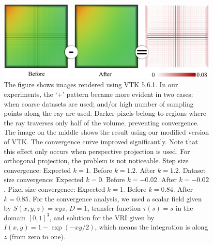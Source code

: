 \begin{figure}[b]
\centering
\includegraphics[width=0.98\linewidth]{chapter5/figures/fp-fcm-before-after.png}
\caption{\label{fig:fp-rcm-example} The figure shows images rendered
  using VTK 5.6.1. In our experiments, the `+'  pattern became more evident
  in two cases:  when coarse datasets are used; and/or high number
   of sampling points along the ray are used. 
   Darker pixels belong to regions where the
  ray traverses only half of the volume, preventing convergence. The
  image on the middle shows the result using our modified version of
  VTK. The convergence curve improved significantly. Note that this
  effect only occurs when perspective projection is used. For
  orthogonal projection, the problem is not noticeable. Step size
  convergence: Expected $k=1$. Before $k=1.2$.  After $k=1.2$.
  Dataset size convergence: Expected $k=0$. Before $k=-0.02$. After
  $k=-0.02$. Pixel size convergence: Expected $k=1$. Before $k=0.84$.
  After $k=0.85$. For the convergence analysis, we used a scalar field
  given by $S(x,y,z) = xyz$, $D=1$, transfer function $\tau(s) = s$ in the
  domain $\left[0,1\right]^3$, and solution for the VRI given by
  $I(x,y) = 1-\exp\left( -x y / 2 \right)$, which means the integration is 
  along $z$ (from zero to one).}
\end{figure}

